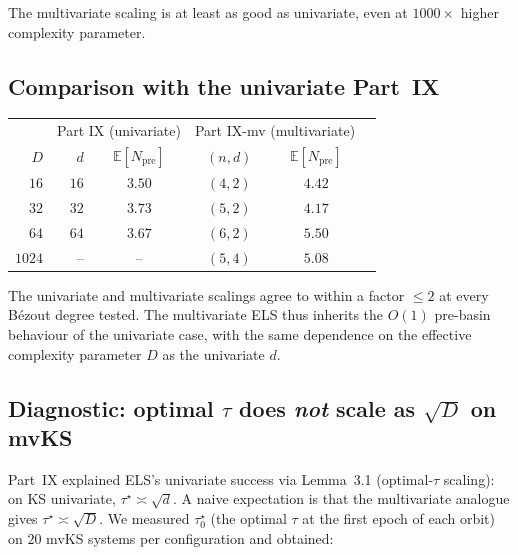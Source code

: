 \documentclass[11pt,a4paper]{article}
\begin{document}
The multivariate scaling is at least as good as univariate, even at $1000\times$ higher complexity parameter.

\subsection{Comparison with the univariate Part~IX}

\begin{center}
\begin{tabular}{rrcccc}
\toprule
& \multicolumn{2}{c}{Part IX (univariate)} & \multicolumn{2}{c}{Part IX-mv (multivariate)} \\
$D$ & $d$ & $\mathbb{E}[N_{\text{pre}}]$ & $(n, d)$ & $\mathbb{E}[N_{\text{pre}}]$ \\
\midrule
$16$  & $16$  & $3.50$ & $(4, 2)$ & $4.42$ \\
$32$  & $32$  & $3.73$ & $(5, 2)$ & $4.17$ \\
$64$  & $64$  & $3.67$ & $(6, 2)$ & $5.50$ \\
$1024$ & --   & --     & $(5, 4)$ & $5.08$ \\
\bottomrule
\end{tabular}
\end{center}

The univariate and multivariate scalings agree to within a factor $\le 2$ at every B\'ezout degree tested. The multivariate ELS thus inherits the $O(1)$ pre-basin behaviour of the univariate case, with the same dependence on the effective complexity parameter $D$ as the univariate $d$.

\subsection{Diagnostic: optimal $\tau$ does \emph{not} scale as $\sqrt D$ on mvKS}\label{sec:tau-diagnostic}

Part~IX explained ELS's univariate success via Lemma~3.1 (optimal-$\tau$ scaling): on KS univariate, $\tau^\star \asymp \sqrt d$. A naive expectation is that the multivariate analogue gives $\tau^\star \asymp \sqrt D$. We measured $\tau^\star_0$ (the optimal $\tau$ at the first epoch of each orbit) on $20$ mvKS systems per configuration and obtained:
\end{document}
